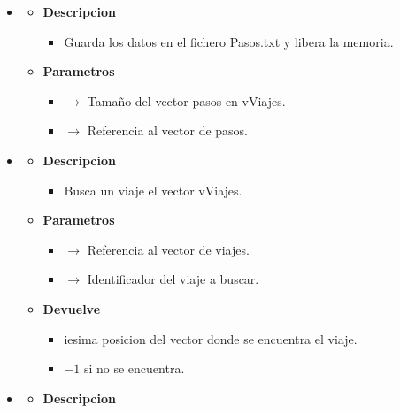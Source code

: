 \begin{itemize}
\begin{itemize}
\begin{itemize}
		\end{itemize}
	\end{itemize}
    \item \label{def:savevipa}
    \begin{itemize}
        \item \textbf{Descripcion}
        \begin{itemize}
			\item  Guarda los datos en el fichero Pasos.txt y libera la memoria.
		\end{itemize}
		\item \textbf{Parametros}
		\begin{itemize}
            \item {} $\rightarrow$ Tamaño del vector pasos en vViajes.
			\item {} $\rightarrow$ Referencia al vector de pasos.
		\end{itemize}
	\end{itemize}
    \newpage
    \item \label{def:findivi}
    \begin{itemize}
        \item \textbf{Descripcion}
        \begin{itemize}
			\item  Busca un viaje el vector vViajes.
		\end{itemize}
		\item \textbf{Parametros}
		\begin{itemize}
			\item {} $\rightarrow$ Referencia al vector de viajes.
            \item {} $\rightarrow$ Identificador del viaje a buscar.
		\end{itemize}
        \item \textbf{Devuelve}
		\begin{itemize}
			\item iesima posicion del vector donde se encuentra el viaje.
            \item $-1$ si no se encuentra.
		\end{itemize}
	\end{itemize}
    \item \label{def:listviopen}
    \begin{itemize}
        \item \textbf{Descripcion}
        \begin{itemize}

\end{itemize}
\end{itemize}
\end{itemize}
